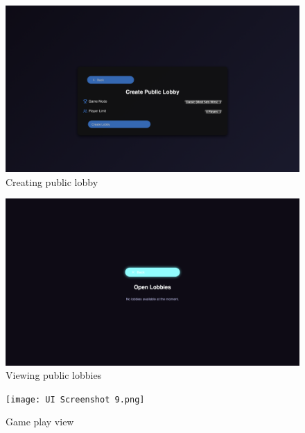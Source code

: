 \begin{figure}[h!]
\centering
\includegraphics[width=1\linewidth]{UI Screenshot 7.png}
\caption{Creating public lobby}
\label{fig:ui7}
\end{figure}

\begin{figure}[h!]
\centering
\includegraphics[width=1\linewidth]{UI Screenshot 8.png}
\caption{Viewing public lobbies}
\label{fig:ui8}
\end{figure}

\begin{figure}[h!]
\centering
\texttt{[image: UI Screenshot 9.png]}
\caption{Game play view}
\label{fig:ui9}
\end{figure}

